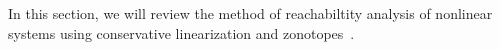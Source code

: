 In this section, we will review the method of reachabiltity analysis of nonlinear systems using conservative linearization and zonotopes~\cite{althoff2008reachability}.  
